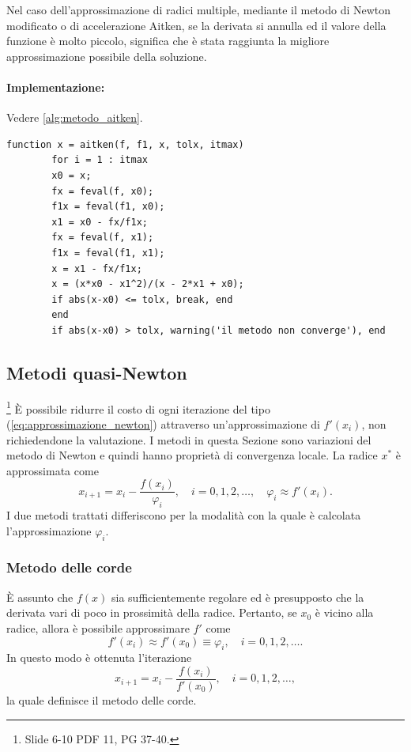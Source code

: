\begin{remark}\label{rem:criterio_arresto_derivata_nulla}
	Nel caso dell'approssimazione di radici multiple, mediante il metodo di Newton modificato o di accelerazione Aitken, se la derivata si annulla ed il valore della funzione è molto piccolo, significa che è stata raggiunta la migliore approssimazione possibile della soluzione.
\end{remark}

\paragraph{Implementazione:} Vedere \ref{alg:metodo_aitken}.
\begin{algorithm}
	\caption{Implementazione metodo di Aitken.}\label{alg:metodo_aitken}
	\begin{lstlisting}[style=Matlab-editor]
		function x = aitken(f, f1, x, tolx, itmax)
		for i = 1 : itmax
		x0 = x;
		fx = feval(f, x0);
		f1x = feval(f1, x0);
		x1 = x0 - fx/f1x;
		fx = feval(f, x1);
		f1x = feval(f1, x1);
		x = x1 - fx/f1x;
		x = (x*x0 - x1^2)/(x - 2*x1 + x0);
		if abs(x-x0) <= tolx, break, end
		end
		if abs(x-x0) > tolx, warning('il metodo non converge'), end
	\end{lstlisting}
\end{algorithm}

\subsection{Metodi quasi-Newton}
\footnote{Slide 6-10 PDF 11, PG 37-40.}
È possibile ridurre il costo di ogni iterazione del tipo (\ref{eq:approssimazione_newton}) attraverso un'approssimazione di $f'(x_i)$, non richiedendone la valutazione. I metodi in questa Sezione sono variazioni del metodo di Newton e quindi hanno proprietà di convergenza locale. La radice $x^*$ è approssimata come
\begin{equation}\label{eq:approssimazione_quasi_newton}
	x_{i+1}=x_i-\frac{f(x_i)}{\varphi_i}, \quad i=0,1,2,\hdots, \quad\varphi_i\approx f'(x_i).
\end{equation}
I due metodi trattati differiscono per la modalità con la quale è calcolata l'approssimazione $\varphi_i$.

\subsubsection{Metodo delle corde}\label{sssec:metodo_corde}
È assunto che $f(x)$ sia sufficientemente regolare ed è presupposto che la derivata vari di poco in prossimità della radice.
Pertanto, se $x_0$ è vicino alla radice, allora è possibile approssimare $f'$ come
\begin{equation*}
	f'(x_i)\approx f'(x_0)\equiv\varphi_i,\quad i=0,1,2,\hdots.
\end{equation*}
In questo modo è ottenuta l'iterazione 
\begin{equation}\label{eq:approxCorde}
	x_{i+1}=x_i-\frac{f(x_i)}{f'(x_0)}, \quad i=0,1,2,\hdots,
\end{equation}
la quale definisce il metodo delle corde.

